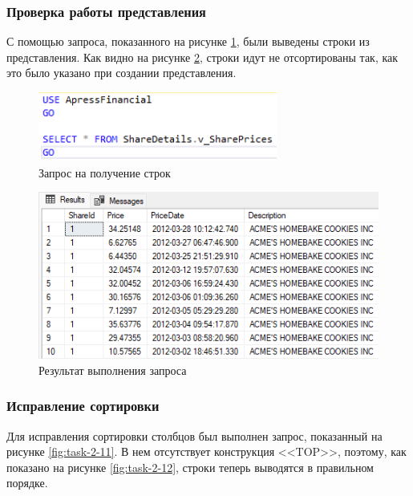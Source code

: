 \documentclass[a4paper, 14pt]{extarticle}
\begin{document}
\subsubsection{Проверка работы представления}

С помощью запроса, показанного на рисунке \ref{fig:task-2-9}, были выведены
строки из представления. Как видно на рисунке \ref{fig:task-2-10}, строки идут
не отсортированы так, как это было указано при создании представления.

\begin{figure}[H]
  \centering
  \includegraphics[width=0.7\textwidth]{images/task-2/9.png}
  \caption{Запрос на получение строк}
  \label{fig:task-2-9}
\end{figure}

\begin{figure}[H]
  \centering
  \includegraphics[width=\textwidth]{images/task-2/10.png}
  \caption{Результат выполнения запроса}
  \label{fig:task-2-10}
\end{figure}

\subsubsection{Исправление сортировки}

Для исправления сортировки столбцов был выполнен запрос, показанный на рисунке
\ref{fig:task-2-11}. В нем отсутствует конструкция
<<\foreignlanguage{english}{TOP}>>, поэтому, как показано на рисунке
\ref{fig:task-2-12}, строки теперь выводятся в правильном порядке.
\end{document}
